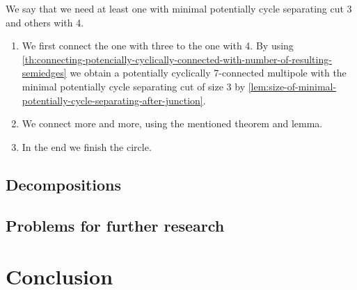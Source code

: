 \documentclass[12pt, twoside]{book}
\begin{document}
We say that we need at least one with minimal potentially cycle separating cut 3 and others with 4.

\begin{enumerate}
	\item We first connect the one with three to the one with 4. By using \cref{th:connecting-potencially-cyclically-connected-with-number-of-resulting-semiedges} we obtain a potentially cyclically 7-connected multipole with the minimal potentially cycle separating cut of size 3 by \cref{lem:size-of-minimal-potentially-cycle-separating-after-junction}.
	\item We connect more and more, using the mentioned theorem and lemma.
	\item In the end we finish the circle. 
\end{enumerate}

\section{Decompositions}

\todo{}

\section{Problems for further research}

\todo{}

\chapter*{Conclusion}

\newpage
\thispagestyle{empty}




\end{document}
